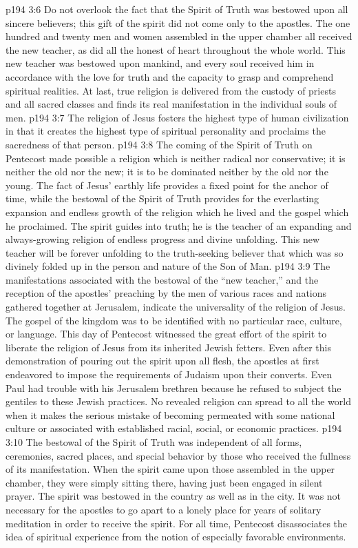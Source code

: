 \pc \vs p194 3:6 Do not overlook the fact that the Spirit of Truth was bestowed upon all sincere believers; this gift of the spirit did not come only to the apostles. The one hundred and twenty men and women assembled in the upper chamber all received the new teacher, as did all the honest of heart throughout the whole world. This new teacher was bestowed upon mankind, and every soul received him in accordance with the love for truth and the capacity to grasp and comprehend spiritual realities. At last, true religion is delivered from the custody of priests and all sacred classes and finds its real manifestation in the individual souls of men.
\pc \vs p194 3:7 The religion of Jesus fosters the highest type of human civilization in that it creates the highest type of spiritual personality and proclaims the sacredness of that person.
\vs p194 3:8 The coming of the Spirit of Truth on Pentecost made possible a religion which is neither radical nor conservative; it is neither the old nor the new; it is to be dominated neither by the old nor the young. The fact of Jesus’ earthly life provides a fixed point for the anchor of time, while the bestowal of the Spirit of Truth provides for the everlasting expansion and endless growth of the religion which he lived and the gospel which he proclaimed. The spirit guides into  truth; he is the teacher of an expanding and always\hyp{}growing religion of endless progress and divine unfolding. This new teacher will be forever unfolding to the truth\hyp{}seeking believer that which was so divinely folded up in the person and nature of the Son of Man.
\vs p194 3:9 The manifestations associated with the bestowal of the “new teacher,” and the reception of the apostles’ preaching by the men of various races and nations gathered together at Jerusalem, indicate the universality of the religion of Jesus. The gospel of the kingdom was to be identified with no particular race, culture, or language. This day of Pentecost witnessed the great effort of the spirit to liberate the religion of Jesus from its inherited Jewish fetters. Even after this demonstration of pouring out the spirit upon all flesh, the apostles at first endeavored to impose the requirements of Judaism upon their converts. Even Paul had trouble with his Jerusalem brethren because he refused to subject the gentiles to these Jewish practices. No revealed religion can spread to all the world when it makes the serious mistake of becoming permeated with some national culture or associated with established racial, social, or economic practices.
\vs p194 3:10 The bestowal of the Spirit of Truth was independent of all forms, ceremonies, sacred places, and special behavior by those who received the fullness of its manifestation. When the spirit came upon those assembled in the upper chamber, they were simply sitting there, having just been engaged in silent prayer. The spirit was bestowed in the country as well as in the city. It was not necessary for the apostles to go apart to a lonely place for years of solitary meditation in order to receive the spirit. For all time, Pentecost disassociates the idea of spiritual experience from the notion of especially favorable environments.
